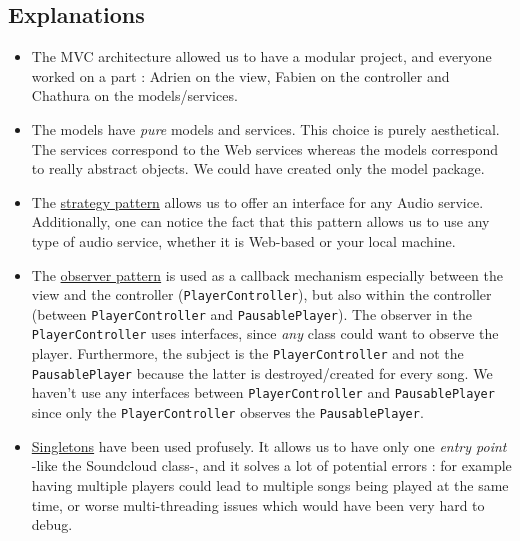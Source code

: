\documentclass{report}
\begin{document}
\subsection{Explanations}

\begin{itemize}
\item The MVC architecture allowed us to have a modular project, and everyone worked on a part : Adrien on the view, Fabien on the controller and Chathura on the models/services. 
\item The models have \textit{pure} models and services. This choice is purely aesthetical. The services correspond to the Web services whereas the models correspond to really abstract objects. We could have created only the model package.
\item The \href{https://en.wikipedia.org/wiki/Strategy_pattern}{strategy pattern} allows us to offer an interface for any Audio service. Additionally, one can notice the fact that this pattern allows us to use any type of audio service, whether it is Web-based or your local machine.
\item The \href{https://en.wikipedia.org/wiki/Observer_pattern}{observer pattern} is used as a callback mechanism especially between the view and the controller (\texttt{PlayerController}), but also within the controller (between \texttt{PlayerController} and \texttt{PausablePlayer}). The observer in the \texttt{PlayerController} uses interfaces, since \textit{any} class could want to observe the player. Furthermore, the subject is the \texttt{PlayerController} and not the \texttt{PausablePlayer} because the latter is destroyed/created for every song. We haven't use any interfaces between \texttt{PlayerController} and \texttt{PausablePlayer} since only the \texttt{PlayerController} observes the \texttt{PausablePlayer}.
\item \href{http://weknowmemes.com/generator/uploads/generated/g1406353714448670979.jpg}{Singletons} have been used profusely. It allows us to have only one \textit{entry point} -like the Soundcloud class-, and it solves a lot of potential errors : for example having multiple players could lead to multiple songs being played at the same time, or worse multi-threading issues which would have been very hard to debug. 
\end{itemize}

\end{document}
